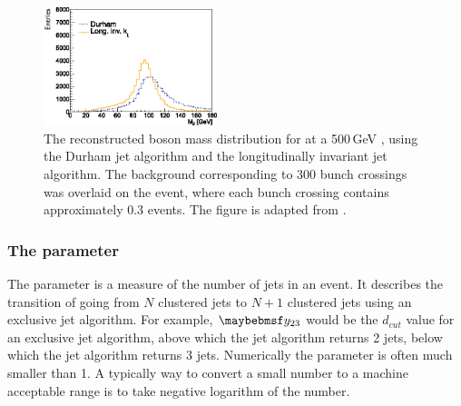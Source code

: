 \begin{figure}[tbph]
\centering

    \includegraphics[width=0.45\textwidth]{pandora/JetAlgsValencia}

\caption{The reconstructed \PZ boson mass distribution for  at a 500\,GeV \CLIC, using the Durham jet algorithm and the longitudinally invariant \kt jet algorithm. The \ggHad background corresponding to 300 bunch crossings was overlaid on the event, where each bunch crossing contains approximately 0.3 \ggHad events. The figure is adapted from \cite{Boronat:2014hva}.}
\label{fig:pandoraJetCompare}
\end{figure}





\subsubsection{The \y{} parameter}
\label{sec:pandoraYparameter}
The \y{} parameter is a measure of the number of jets in an event.  It describes the transition of  going from $N$ clustered jets to $N\!+\!1$ clustered jets using an exclusive jet algorithm. For example, $\y{23}$ would be the $d_{cut}$ value for an exclusive jet algorithm, above which the jet algorithm returns 2 jets, below which the jet algorithm returns 3 jets. Numerically the \y{} parameter is often much smaller than 1. A typically way to convert a small number to a machine acceptable range is to take  negative logarithm of the number.

